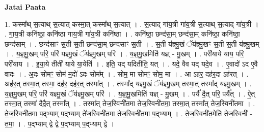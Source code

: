 \documentclass[17pt]{extarticle}
\begin{document}
\textbf{Jatai Paata} \newline

1. कस्मा᳚थ् स॒त्याथ् स॒त्यात् कस्मा॒त् कस्मा᳚थ् स॒त्यात् । . स॒त्याद् गा॑य॒त्री गा॑य॒त्री स॒त्याथ् स॒त्याद् गा॑य॒त्री । . गा॒य॒त्री कनि॑ष्ठा॒ कनि॑ष्ठा गाय॒त्री गा॑य॒त्री कनि॑ष्ठा । . कनि॑ष्ठा॒ छन्द॑सा॒म् छन्द॑सा॒म् कनि॑ष्ठा॒ कनि॑ष्ठा॒ छन्द॑साम् । . छन्द॑साꣳ स॒ती स॒ती छन्द॑सा॒म् छन्द॑साꣳ स॒ती । . स॒ती य॑ज्ञ्मु॒खं ॅय॑ज्ञ्मु॒खꣳ स॒ती स॒ती य॑ज्ञ्मु॒खम् । . य॒ज्ञ्॒मु॒खम् परि॒ परि॑ यज्ञ्मु॒खं ॅय॑ज्ञ्मु॒खम् परि॑ । . य॒ज्ञ्॒मु॒खमिति॑ यज्ञ् - मु॒खम् । . परी॑याये याय॒ परि॒ परी॑याय । . इ॒या॒ये तीती॑ याये या॒येति॑ । . इति॒ यद् यदितीति॒ यत् । . यदे॒ वैव यद् यदे॒व । . ए॒वादो॑ ऽद ए॒वै वादः । . अ॒दः सोमꣳ॒॒ सोम॑ म॒दो॑ ऽदः सोम᳚म् । . सोम॒ मा सोमꣳ॒॒ सोम॒ मा । . आ ऽह॑र॒ दह॑र॒दा ऽह॑रत् । . अह॑र॒त् तस्मा॒त् तस्मा॒ दह॑र॒ दह॑र॒त् तस्मा᳚त् । . तस्मा᳚द् यज्ञ्मु॒खं ॅय॑ज्ञ्मु॒खम् तस्मा॒त् तस्मा᳚द् यज्ञ्मु॒खम् । . य॒ज्ञ्॒मु॒खम् परि॒ परि॑ यज्ञ्मु॒खं ॅय॑ज्ञ्मु॒खम् परि॑ । . य॒ज्ञ्॒मु॒खमिति॑ यज्ञ् - मु॒खम् । . पर्यै॑ दै॒त् परि॒ पर्यै᳚त् । . ऐ॒त् तस्मा॒त् तस्मा॑ दैदै॒त् तस्मा᳚त् । . तस्मा᳚त् तेज॒स्विनी॑तमा तेज॒स्विनी॑तमा॒ तस्मा॒त् तस्मा᳚त् तेज॒स्विनी॑तमा । . ते॒ज॒स्विनी॑तमा प॒द्भ्याम् प॒द्भ्याम् ते॑ज॒स्विनी॑तमा तेज॒स्विनी॑तमा प॒द्भ्याम् । . ते॒ज॒स्विनी॑त॒मेति॑ तेज॒स्विनी᳚ - त॒मा॒ । . प॒द्भ्याम् द्वे द्वे प॒द्भ्याम् प॒द्भ्याम् द्वे । \newline
\end{document}
